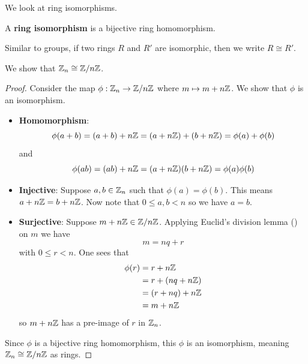 We look at ring isomorphisms.
\begin{definition}
    A \textbf{ring isomorphism} is a bijective ring homomorphism.
\end{definition}
Similar to groups, if two rings $R$ and $R'$ are isomorphic, then we write $R \cong R'$.

\begin{example}
    We show that $\mathbb{Z}_n \cong \mathbb{Z}/n\mathbb{Z}$.

    \begin{proof}
        Consider the map $\phi:\mathbb{Z}_n \to \mathbb{Z}/n\mathbb{Z}$ where $m \mapsto m + n\mathbb{Z}$. We show that $\phi$ is an isomorphism.
        \begin{itemize}
            \item \textbf{Homomorphism}:
            \[
                \phi(a+b) = (a+b) + n\mathbb{Z} = (a + n\mathbb{Z}) + (b + n\mathbb{Z}) = \phi(a) + \phi(b)
            \]
            and
            \[
                \phi(ab) = (ab) + n\mathbb{Z} = (a+n\mathbb{Z})(b+n\mathbb{Z}) = \phi(a)\phi(b)
            \]

            \item \textbf{Injective}: Suppose $a, b \in \mathbb{Z}_n$ such that $\phi(a) = \phi(b)$. This means $a + n\mathbb{Z} = b + n\mathbb{Z}$. Now note that $0 \leq a,b < n$ so we have $a = b$.
            
            \item \textbf{Surjective}: Suppose $m + n\mathbb{Z} \in \mathbb{Z}/n\mathbb{Z}$. Applying Euclid's division lemma () on $m$ we have
            \[
                m = nq + r
            \]
            with $0 \leq r < n$. One sees that
            \begin{align*}
                \phi(r) &= r + n\mathbb{Z}\\
                &= r + (nq + n\mathbb{Z})\\
                &= (r + nq) + n\mathbb{Z}\\
                &= m + n\mathbb{Z}
            \end{align*}
            so $m + n\mathbb{Z}$ has a pre-image of $r$ in $\mathbb{Z}_n$.
        \end{itemize}
        Since $\phi$ is a bijective ring homomorphism, this $\phi$ is an isomorphism, meaning $\mathbb{Z}_n \cong \mathbb{Z}/n\mathbb{Z}$ as rings.
    \end{proof}
\end{example}
